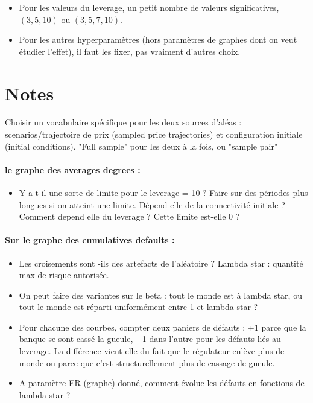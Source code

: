 \documentclass{article}
\begin{document}
\begin{appendices}
\begin{itemize}
    \item Pour les valeurs du leverage, un petit nombre de valeurs significatives, $(3, 5, 10)$ ou $(3, 5, 7, 10)$.
    
    \item Pour les autres hyperparamètres (hors paramètres de graphes dont on veut étudier l'effet), il faut les fixer, pas vraiment d'autres choix.
\end{itemize}


\section{Notes}

\paragraph{}
Choisir un vocabulaire spécifique pour les deux sources d'aléas : scenarios/trajectoire de prix (sampled price trajectories) et configuration initiale (initial conditions). "Full sample" pour les deux à la fois, ou "sample pair"

\paragraph{ le graphe des averages degrees :}

\begin{itemize}
\item Y a t-il une sorte de limite pour le leverage = 10 ? Faire sur des périodes plus longues si on atteint une limite. Dépend elle de la connectivité initiale ? Comment depend elle du leverage ? Cette limite est-elle 0 ? 
\end{itemize}


\paragraph{Sur le graphe des cumulatives defaults :}
\begin{itemize}
\item Les croisements sont -ils des artefacts de l'aléatoire ?
Lambda star : quantité max de risque autorisée. 
\item On peut faire des variantes sur le beta : tout le monde est à lambda star, ou tout le monde est réparti uniformément entre 1 et lambda star ?
\item Pour chacune des courbes, compter deux paniers de défauts : +1 parce que la banque se sont cassé la gueule, +1 dans l'autre pour les défauts liés au leverage. La différence vient-elle du fait que le régulateur enlève plus de monde ou parce que c'est structurellement plus de cassage de gueule.
\item A paramètre ER (graphe) donné, comment évolue les défauts en fonctions de lambda star ?
\end{itemize}


\end{appendices}
\end{document}
